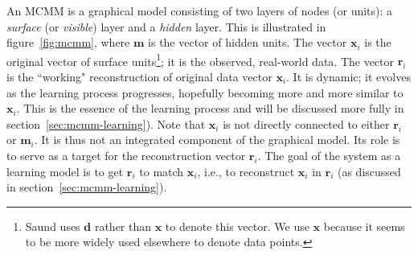 An MCMM is a graphical model consisting of two layers of nodes (or units): a \emph{surface} (or \emph{visible}) 
layer and a \emph{hidden} layer.
This is illustrated in figure~\ref{fig:mcmm}, where $\mathbf{m}$ 
is the vector of hidden units. The vector $\mathbf{x}_i$ is the 
original vector of surface units\footnote{Saund uses $\mathbf{d}$ 
rather than $\mathbf{x}$ to denote this vector. We use $\mathbf{x}$ because it seems to be more widely
used elsewhere to denote data points.}; it is the observed, 
real-world data. The vector $\mathbf{r}_i$ is the ``working" 
reconstruction of original data vector $\textbf{x}_i$. It is dynamic; 
it evolves as the learning process progresses, hopefully 
becoming more and more similar to $\mathbf{x}_i$. 
This is the essence of the learning process and will be 
discussed more fully in section~\ref{sec:mcmm-learning}).
Note that $\mathbf{x}_i$ is not directly connected to either $\mathbf{r}_i$ 
or $\mathbf{m}_i$. It is thus not an integrated component of the graphical 
model. Its role is to serve as a target for the reconstruction vector $\mathbf{r}_i$. 
The goal of the system as a learning model is to get $\mathbf{r}_i$ to 
match $\mathbf{x}_i$, i.e., to reconstruct $\mathbf{x}_i$ in 
$\mathbf{r}_i$ (as discussed in section~\ref{sec:mcmm-learning}).


